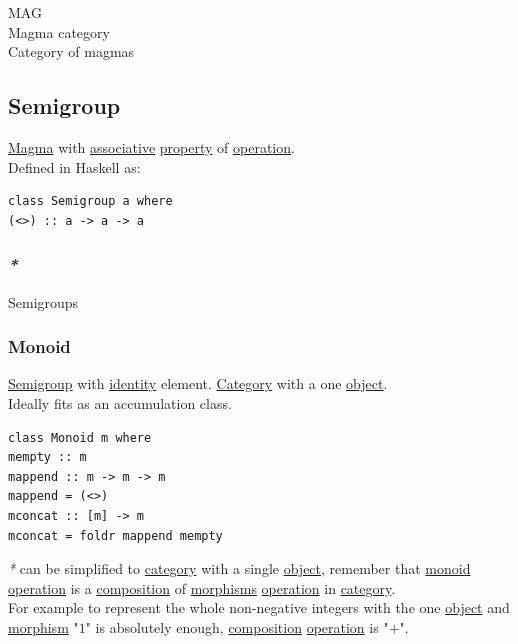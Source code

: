 \documentclass[a4paper,14pt,oneside]{book}
\begin{document}
{\label{org6e15e2f}MAG\\
\label{orgf8cd2af}Magma category\\
\label{org056dbca}Category of magmas\\

\subsection{\label{orgbd83efb}Semigroup}
\label{sec:org4102da6}
\hyperref[orgf909263]{Magma} with \hyperref[org3beb7c5]{associative} \hyperref[org2731790]{property} of \hyperref[org4cee8d5]{operation}.\\

Defined in Haskell as:\\
\begin{verbatim}
class Semigroup a where
(<>) :: a -> a -> a
\end{verbatim}

\subsubsection{\emph{*}}
\label{sec:orga994085}

\label{orge4293a4}Semigroups\\

\subsubsection{\label{orgcf84af2}Monoid}
\label{sec:org5f15c09}
\hyperref[orgbd83efb]{Semigroup} with \hyperref[org4f76d7c]{identity} element. \hyperref[orgf2b19ad]{Category} with a one \hyperref[orgcc1bbec]{object}.\\

Ideally fits as an accumulation class.\\

\begin{verbatim}
class Monoid m where
mempty :: m
mappend :: m -> m -> m
mappend = (<>)
mconcat :: [m] -> m
mconcat = foldr mappend mempty
\end{verbatim}

\emph{*} can be simplified to \hyperref[orgf2b19ad]{category} with a single \hyperref[orgcc1bbec]{object}, remember that \hyperref[orgcf84af2]{monoid} \hyperref[org4cee8d5]{operation} is a \hyperref[orgd27cab7]{composition} of \hyperref[org43d1069]{morphisms} \hyperref[org4cee8d5]{operation} in \hyperref[orgf2b19ad]{category}.\\
For example to represent the whole non-negative integers with the one \hyperref[orgcc1bbec]{object} and \hyperref[orgc09f1a4]{morphism} "\(1\)" is absolutely enough, \hyperref[orgd27cab7]{composition} \hyperref[org4cee8d5]{operation} is "\(+\)".\\

}
\end{document}
